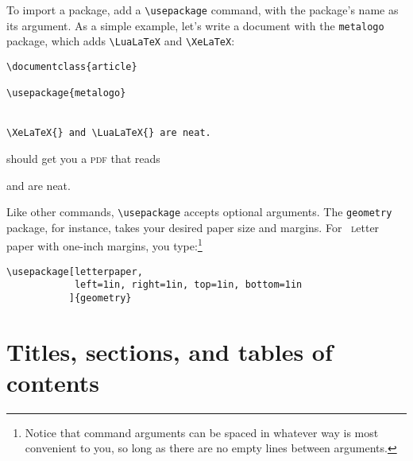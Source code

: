 To import a package, add a \verb|\usepackage| command,
with the package's name as its argument.
As a simple example, let's write a document with the \texttt{metalogo}
package, which adds \verb|\LuaLaTeX| and \verb|\XeLaTeX|:
\begin{leftfigure}
\begin{lstlisting}
\documentclass{article}

\usepackage{metalogo}


\XeLaTeX{} and \LuaLaTeX{} are neat.

\end{lstlisting}
\end{leftfigure}
\begin{samepage}
should get you a \textsc{pdf} that reads
\begin{leftfigure}
\lm \XeLaTeX{} and \LuaLaTeX{} are neat.
\end{leftfigure}
\end{samepage}
Like other commands, \verb|\usepackage| accepts optional arguments.
The \texttt{geometry} package, for instance,
takes your desired paper size and margins.
For ~\textsc{l}etter paper with one-inch margins,
you type:\footnote{Notice
that command arguments can be spaced in whatever way is most convenient to you,
so long as there are no empty lines between arguments.}
\begin{leftfigure}
\begin{lstlisting}
\usepackage[letterpaper,
            left=1in, right=1in, top=1in, bottom=1in
           ]{geometry}
\end{lstlisting}
\end{leftfigure}

\section{Titles, sections, and tables of contents}

